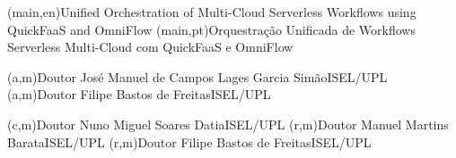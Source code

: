 \nctitle(main,en){Unified Orchestration of Multi-Cloud Serverless Workflows using QuickFaaS and OmniFlow}%
\nctitle(main,pt){Orquestração Unificada de Workflows Serverless Multi-Cloud com QuickFaaS e OmniFlow}%


\ncmember(a,m){Doutor José Manuel de Campos Lages Garcia Simão}{ISEL/UPL}
\ncmember(a,m){Doutor Filipe Bastos de Freitas}{ISEL/UPL}

\ncmember(c,m){Doutor Nuno Miguel Soares Datia}{ISEL/UPL}
\ncmember(r,m){Doutor Manuel Martins Barata}{ISEL/UPL}
\ncmember(r,m){Doutor Filipe Bastos de Freitas}{ISEL/UPL}


